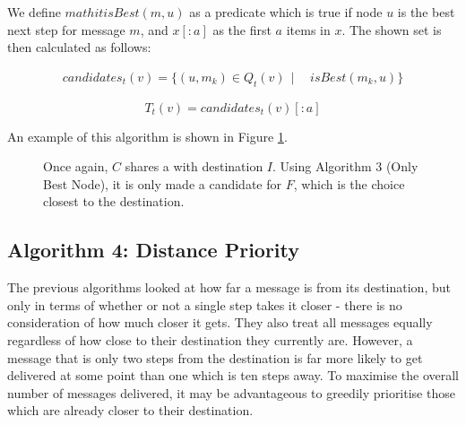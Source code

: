 \documentclass[bsc,frontabs,twoside,singlespacing,parskip,deptreport]{infthesis}     %
\begin{document}
We define $mathit{isBest}(m, u)$ as a predicate which is true if node $u$ is the best next step for message $m$, and $x[:a]$ as the first $a$ items in $x$. The shown set is then calculated as follows:

\begin{equation}
\begin{split}
candidates_{t}(v) = \{ (u, m_{k}) \in Q_{t}(v) \:\: | \:\: & \mathit{isBest}(m_{k}, u) \}
\end{split}
\end{equation}

\begin{equation}
T_{t}(v) = candidates_{t}(v)[:a]
\end{equation}

An example of this algorithm is shown in Figure \ref{fig:alg_3_example}.

\begin{figure}[h]
\centering
{}
\caption{Once again, $C$ shares a with destination $I$. Using Algorithm 3 (Only Best Node), it is only made a candidate for $F$, which is the choice closest to the destination.}
\label{fig:alg_3_example}
\end{figure}

\subsection{Algorithm 4: Distance Priority}
The previous algorithms looked at how far a message is from its destination, but only in terms of whether or not a single step takes it closer - there is no consideration of how much closer it gets. They also treat all messages equally regardless of how close to their destination they currently are. However, a message that is only two steps from the destination is far more likely to get delivered at some point than one which is ten steps away. To maximise the overall number of messages delivered, it may be advantageous to greedily prioritise those which are already closer to their destination.
\end{document}
